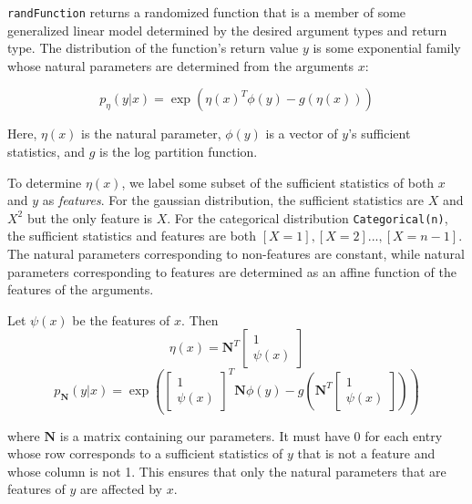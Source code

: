 \documentclass{article}
\begin{document}
    
    \texttt{randFunction} returns a randomized function that is a member of some generalized linear model
    determined by the desired argument types and return type.
    The distribution
    of the function's return value $y$
    is some exponential family whose natural
    parameters are determined from the arguments $x$:

    $$p_{\eta}(y | x) = \exp\left(\eta(x)^T \phi(y) - g(\eta(x))\right)$$

    Here, $\eta(x)$ is the natural parameter, $\phi(y)$ is a vector of $y$'s sufficient statistics,
    and $g$ is the log partition function.

    To determine $\eta(x)$, we label
    some subset of the sufficient statistics of both $x$ and $y$ as \emph{features}.  For the gaussian
    distribution, the sufficient statistics are $X$ and $X^2$ but the only feature is $X$.  For the
    categorical distribution \texttt{Categorical(n)}, the sufficient statistics
    and features are both $[X = 1], [X = 2] ..., [X=n - 1]$.
    The natural
    parameters corresponding to non-features are constant, while natural
    parameters corresponding to features are determined as an affine
    function of the features of the arguments.

    Let $\psi(x)$ be the features of $x$.  Then
  $$\eta(x) = \mathbf{N}^T \begin{bmatrix} 1 \\ \psi(x) \end{bmatrix}$$
    $$p_{\mathbf{N}}(y | x) = \exp\left(\begin{bmatrix} 1 \\ \psi(x) \end{bmatrix} ^T \mathbf{N} \phi(y) - g\left(\mathbf{N}^T \begin{bmatrix} 1 \\ \psi(x) \end{bmatrix}\right)\right)$$

    where $\mathbf{N}$ is a matrix containing our parameters.  It must have 0 for each entry whose row corresponds
    to a sufficient statistics of $y$ that is not a feature and whose column is not 1.
    This ensures that only the
    natural parameters that are features of $y$ are affected by $x$.
\end{document}

